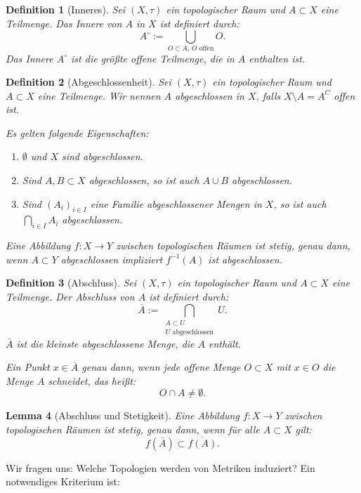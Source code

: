 \documentclass[a4paper,12pt]{article}
\theoremstyle{break}
\newtheorem{definition}{Definition}[section]
\newtheorem{lemma}[definition]{Lemma}
\begin{document}
\begin{definition}[Inneres]
Sei $(X, \tau)$ ein topologischer Raum und $A \subset X$ eine Teilmenge. Das \emph{Innere} von $A$ in $X$ ist definiert durch:
\[
A^\circ := \bigcup_{O \subset A, \, O \text{ offen}} O.
\]
Das Innere $A^\circ$ ist die größte offene Teilmenge, die in $A$ enthalten ist.
\end{definition}

\begin{definition}[Abgeschlossenheit]
Sei $(X, \tau)$ ein topologischer Raum und $A \subset X$ eine Teilmenge. Wir nennen $A$ \emph{abgeschlossen} in $X$, falls $X \setminus A = A^C$ offen ist. 

Es gelten folgende Eigenschaften:
\begin{enumerate}
    \item $\emptyset$ und $X$ sind abgeschlossen.
    \item Sind $A, B \subset X$ abgeschlossen, so ist auch $A \cup B$ abgeschlossen.
    \item Sind $(A_i)_{i \in I}$ eine Familie abgeschlossener Mengen in $X$, so ist auch $\bigcap_{i \in I} A_i$ abgeschlossen.
\end{enumerate}

Eine Abbildung $f: X \to Y$ zwischen topologischen Räumen ist \emph{stetig}, genau dann, wenn $A \subset Y$ abgeschlossen impliziert $f^{-1}(A)$ ist abgeschlossen.
\end{definition}

\begin{definition}[Abschluss]
Sei $(X, \tau)$ ein topologischer Raum und $A \subset X$ eine Teilmenge. Der \emph{Abschluss} von $A$ ist definiert durch:
\[
\overline{A} := \bigcap_{\substack{A \subset U \\ U \text{ abgeschlossen}}} U.
\]
$\overline{A}$ ist die kleinste abgeschlossene Menge, die $A$ enthält.

Ein Punkt $x \in \overline{A}$ genau dann, wenn jede offene Menge $O \subset X$ mit $x \in O$ die Menge $A$ schneidet, das heißt:
\[
O \cap A \neq \emptyset.
\]
\end{definition}

\begin{lemma}[Abschluss und Stetigkeit]
Eine Abbildung $f: X \to Y$ zwischen topologischen Räumen ist \emph{stetig}, genau dann, wenn für alle $A \subset X$ gilt:
\[
f(\overline{A}) \subset \overline{f(A)}.
\]
\end{lemma}

Wir fragen uns: Welche Topologien werden von Metriken induziert? Ein notwendiges Kriterium ist:
\end{document}
